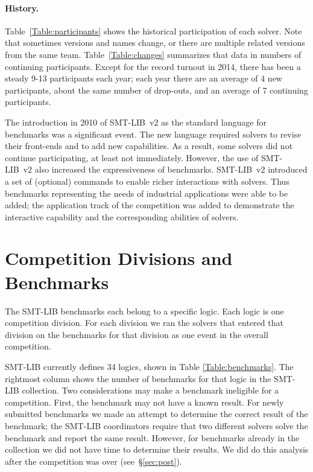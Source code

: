 \documentclass[twoside,11pt]{article}
\begin{document}
\paragraph{History.} Table~\ref{Table:participants} shows the
 historical participation of each solver. Note that sometimes versions and names change, or there are multiple related versions from the same team. 
Table~\ref{Table:changes} summarizes that data in numbers of continuing participants. Except for the record turnout in
 2014, there has been a steady 9-13 participants each year; each year there are an average of 4 new
 participants, about the same number of drop-outs, and an average of 7 continuing participants. 

The introduction in 2010 of SMT-LIB~v2 as the standard language for benchmarks was a significant event. The new language required solvers to revise their front-ends and to add new capabilities.
As a result, some solvers did not continue participating, at least not immediately. However, the use of SMT-LIB~v2 also increased the expressiveness of benchmarks. SMT-LIB~v2 introduced a set of (optional) commands to enable richer interactions with solvers. Thus benchmarks representing the needs of industrial applications were able to be added; 
the application track of the competition was added to demonstrate the interactive capability and the corresponding abilities of solvers.

\section{Competition Divisions and Benchmarks}
\label{sec:benchmarks}

The SMT-LIB benchmarks each belong to a specific logic. Each logic is one competition division. For each division we ran the solvers that entered that division on the benchmarks for that division as one event in the overall competition.

SMT-LIB currently defines 34 logics, shown in Table \ref{Table:benchmarks}. The rightmost column shows the number of benchmarks for that logic in the SMT-LIB collection. Two considerations may make a benchmark ineligible for a competition. First, the benchmark may not have a known result. For newly submitted benchmarks
we made an attempt to determine the correct result of the benchmark; the SMT-LIB coordinators require that two 
different solvers solve the benchmark and report the same result. However, for benchmarks already in the collection we did not have time to determine their results. We did do this analysis after the competition was over (see~\S\ref{sec:post}).
\end{document}
